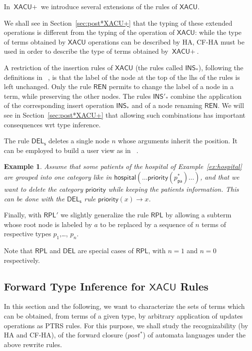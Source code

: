 \documentclass[a4paper]{article}
\newcommand{\remarque}[1]{}
\theoremstyle{plain}
\newtheorem{example}{Example}{\itshape}{\rmfamily}
\newcommand{\post}{\mathit{post}}
\newcommand{\XACU}{\textsf{XACU}}
\newcommand{\INS}{\mathsf{INS}}
\newcommand{\REN}{\mathsf{REN}}
\newcommand{\RPL}{\mathsf{RPL}}
\newcommand{\DEL}{\mathsf{DEL}}
\begin{document}
\medskip{}
In $\XACU+$ we introduce several extensions of the rules of $\XACU$.
\begin{RR}
We shall see in Section~\ref{sec:post*XACU+}
that the typing of these extended operations is different 
from the typing of the operation of $\XACU$:
while the type of terms obtained by $\XACU$ operations
can be described by HA, CF-HA must be used in order to describe
the type of terms obtained by $\XACU+$.
\end{RR}
A restriction of the insertion rules of $\XACU$ (the rules called $\INS_*$),
following the definitions in ~\cite{FundulakiManeth07},
is that the label of the node at the top of the lhs of the rules is left unchanged.
Only the rule $\REN$ permits to change the label of a node in a term,
while preserving the other nodes.
The rules $\INS'_*$ combine the application of the corresponding 
insert operation $\INS_*$ and of a node renaming $\REN$.
We will see in Section~\ref{sec:post*XACU+} that allowing such combinations 
has important consequences wrt type inference.



\noindent
The rule $\DEL_{\mathsf{s}}$ deletes a single node $n$ whose arguments 
inherit the position. It can be employed to build a user view as in ~\cite{FanChan04}. 
\remarque{TODO}
\begin{example}
Assume that some patients of the hospital of Example~\ref{ex:hospital}
are grouped into one category like in
$\mathsf{hospital}(\ldots \mathsf{priority}(p_{\mathsf{pa}}^*)\ldots)$,
and that we want to delete the category $\mathsf{priority}$ while keeping the patients information.
This can be done with the $\DEL_{\mathsf{s}}$ rule
$\mathsf{priority}(x) \to x$.
\end{example}

\noindent
Finally, with $\RPL'$ we slightly generalize the rule $\RPL$ by allowing 
a subterm whose root node is labeled by $a$ 
to be replaced
by a sequence of $n$ terms of respective types $p_1$,\ldots, $p_n$.

\noindent
Note that $\RPL$ and $\DEL$ are special cases of $\RPL$, with $n=1$ and $n = 0$ respectively.





\subsection{Forward Type Inference for $\XACU$ Rules} \label{sec:post*XACU} \label{sec:post*}
In this section and the following, we want to characterize the sets of terms which can 
be obtained, from terms of a given type,
by arbitrary application of updates operations as PTRS rules.
For this purpose, we shall study the recognizability (by HA and CF-HA),
of the forward closure ($\post^*$) of automata languages
under the above rewrite rules.
\end{document}
